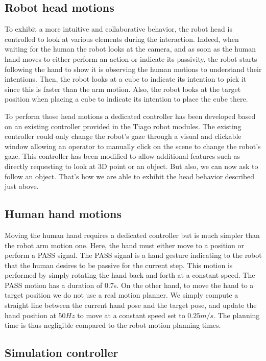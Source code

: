 \subsection{Robot head motions}

To exhibit a more intuitive and collaborative behavior, the robot head is controlled to look at various elements during the interaction. 
Indeed, when waiting for the human the robot looks at the camera, and as soon as the human hand moves to either perform an action or indicate its passivity, the robot starts following the hand to show it is observing the human motions to understand their intentions.
Then, the robot looks at a cube to indicate its intention to pick it since this is faster than the arm motion. 
Also, the robot looks at the target position when placing a cube to indicate its intention to place the cube there.

To perform those head motions a dedicated controller has been developed based on an existing controller provided in the Tiago robot modules. The existing controller could only change the robot's gaze through a visual and clickable window allowing an operator to manually click on the scene to change the robot's gaze. This controller has been modified to allow additional features such as directly requesting to look at 3D point or an object. But also, we can now ask to follow an object. That's how we are able to exhibit the head behavior described just above.  

\subsection{Human hand motions}

Moving the human hand requires a dedicated controller but is much simpler than the robot arm motion one. Here, the hand must either move to a position or perform a PASS signal. The PASS signal is a hand gesture indicating to the robot that the human desires to be passive for the current step. This motion is performed by simply rotating the hand back and forth at a constant speed. The PASS motion has a duration of 0.7s. 
On the other hand, to move the hand to a target position we do not use a real motion planner. We simply compute a straight line between the current hand pose and the target pose, and update the hand position at $50Hz$ to move at a constant speed set to $0.25 m/s$. The planning time is thus negligible compared to the robot motion planning times.

\subsection{Simulation controller}

